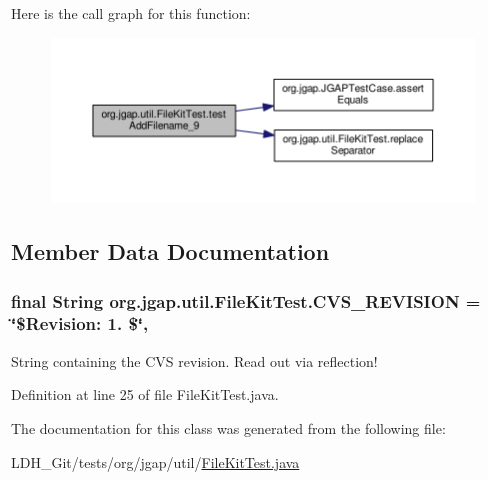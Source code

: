Here is the call graph for this function\-:
\nopagebreak
\begin{figure}[H]
\begin{center}
\leavevmode
\includegraphics[width=350pt]{classorg_1_1jgap_1_1util_1_1_file_kit_test_a6a7c470518dfd218fc090129c04eae02_cgraph}
\end{center}
\end{figure}




\subsection{Member Data Documentation}
\hypertarget{classorg_1_1jgap_1_1util_1_1_file_kit_test_ae77f68255c346d2573235c4a6e9ecf90}{
\subsubsection[{C\-V\-S\-\_\-\-R\-E\-V\-I\-S\-I\-O\-N}]{\setlength{\rightskip}{0pt plus 5cm}final String org.\-jgap.\-util.\-File\-Kit\-Test.\-C\-V\-S\-\_\-\-R\-E\-V\-I\-S\-I\-O\-N = \char`\"{}\$Revision\-: 1. \$\char`\"{}\hspace{0.3cm}{\ttfamily [static]}, {\ttfamily [private]}}}\label{classorg_1_1jgap_1_1util_1_1_file_kit_test_ae77f68255c346d2573235c4a6e9ecf90}
String containing the C\-V\-S revision. Read out via reflection! 

Definition at line 25 of file File\-Kit\-Test.\-java.



The documentation for this class was generated from the following file\-:\begin{DoxyCompactItemize}
\item 
L\-D\-H\-\_\-\-Git/tests/org/jgap/util/\hyperlink{_file_kit_test_8java}{File\-Kit\-Test.\-java}\end{DoxyCompactItemize}
